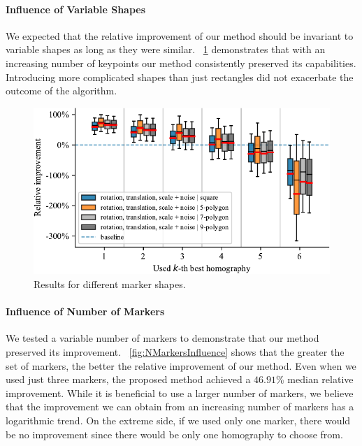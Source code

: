 \paragraph{Influence of Variable Shapes}
We expected that the relative improvement of our method should be invariant to variable shapes as long as they were similar. \figstr{}~\ref{fig:ShapeInfluence} demonstrates that with an increasing number of keypoints our method consistently preserved its capabilities. Introducing more complicated shapes than just rectangles did not exacerbate the outcome of the algorithm.

\begin{figure}[t]
    \centering
    \includegraphics[width=\boxplotimgwidth]{figures/homography/shape_influence.pdf}
    \caption{Results for different marker shapes.}
    \label{fig:ShapeInfluence}
\end{figure}

\paragraph{Influence of Number of Markers}
We tested a variable number of markers to demonstrate that our method preserved its improvement. \figstr{}~\ref{fig:NMarkersInfluence} shows that the greater the set of markers, the better the relative improvement of our method. Even when we used just three markers, the proposed method achieved a $46.91$\% median relative improvement.
While it is beneficial to use a larger number of markers, we believe that the improvement we can obtain from an increasing number of markers has a logarithmic trend. On the extreme side, if we used only one marker, there would be no improvement since there would be only one homography to choose from.

